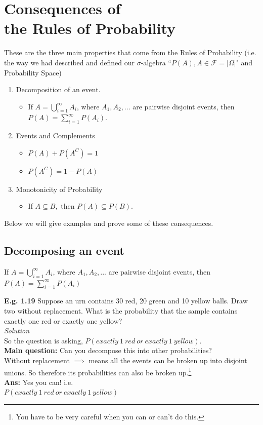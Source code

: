\documentclass[12pt]{book}
\begin{document}
\section{Consequences of \\the Rules of Probability} 
These are the three main properties that come from the Rules of Probability (i.e. the way we had described and defined our $\sigma$-algebra ``$P(A),A\in\mathcal{F}=|\Omega|$" and Probability Space)
\begin{enumerate}
\item Decomposition of an event.
\begin{itemize} \item If $A = \bigcup\limits_{i=1}^\infty A_i$, where $A_1,A_2,...$ are pairwise disjoint events, then $P(A) = \sum\limits_{i=1}^\infty P(A_i)$.\end{itemize}
\item Events and Complements
	\begin{itemize} 
		\item $P(A)+P(A^C)=1$
		\item $P(A^C)=1-P(A)$
	\end{itemize}
\item Monotonicity of Probability
\begin{itemize} \item If $A\subseteq B,$ then $P(A)\subseteq P(B)$.\end{itemize}
\end{enumerate}
Below we will give examples and prove some of these consequences.

\subsection{Decomposing an event}
If $A = \bigcup\limits_{i=1}^\infty A_i$, where $A_1,A_2,...$ are pairwise disjoint events, then $P(A) = \sum\limits_{i=1}^\infty P(A_i)$

\noindent \textbf{E.g. 1.19} Suppose an urn contains 30 red, 20 green and 10 yellow balls. Draw two without replacement. What is the probability that the sample contains exactly one red or exactly one yellow?\\ 
\textit{Solution}\\
So the question is asking, $P(exactly~1~red~or~exactly~1~yellow)$.\\
\textbf{Main question:} Can you decompose this into other probabilities?\\
Without replacement $\implies{}$  means all the events can be broken up into disjoint unions. So therefore its probabilities can also be broken up.\footnote{You have to be very careful when you can or can't do this. }\\
\textbf{Ans:} Yes you can! i.e.\\
$P(exactly~1~red~or~exactly~1~yellow)$\\
\end{document}
